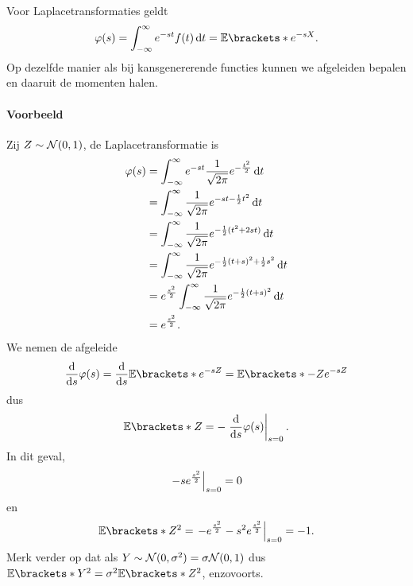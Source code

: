 Voor Laplacetransformaties geldt
\[
    \phi(s) = \int_{-\infty}^\infty e^{-st} f(t) \d t = \E{e^{-sX}}.
\]
Op dezelfde manier als bij kansgenererende functies kunnen we afgeleiden bepalen en daaruit de momenten halen.

\paragraph{Voorbeeld}

Zij $Z \sim \mathcal N(0,1)$, de Laplacetransformatie is
\begin{align*}
    \varphi(s) &= \int_{-\infty}^\infty e^{-st} \frac{1}{\sqrt{2\pi}} e^{-\frac{t^2}{2}} \mathop{}\!\mathrm{d} t \\
    &= \int_{-\infty}^\infty \frac{1}{\sqrt{2 \pi}} e^{-st-\frac 1 2 t^2} \mathop{}\!\mathrm{d} t \\
    &= \int_{-\infty}^\infty \frac{1}{\sqrt{2 \pi}} e^{-\frac 1 2 (t^2 + 2st)} \mathop{}\!\mathrm{d} t \\
    &= \int_{-\infty}^\infty \frac{1}{\sqrt{2 \pi}} e^{- \frac 1 2 (t+s)^2 + \frac 1 2 s^2} \mathop{}\!\mathrm{d} t \\
    &= e^{\frac{s^2}{2}} \int_{-\infty}^\infty \frac{1}{\sqrt{2 \pi}} e^{- \frac 1 2 (t+s)^2} \mathop{}\!\mathrm{d} t \\
    &= e^{\frac{s^2}{2}}.
\end{align*}
We nemen de afgeleide
\[
    \frac{\d}{\d s} \phi (s) = \frac{\d}{\d s} \E{e^{-sZ}} = \E{-Z e^{-sZ}}
\]
dus 
\[
    \E{Z} = - \eval{\frac{\d}{\d s} \phi(s)}_{s=0}.
\]
In dit geval,
\[
    \left.-s e^{\frac{s^2}{2}}\right\rvert_{s=0} = 0
\]
en 
\[
    \E{Z^2} = \eval{-e^{\frac{s^2}{2}} - s^2 e^{\frac{s^2}{2}}}_{s=0} = -1.
\]
Merk verder op dat als $Y \sim \mathcal N(0,\sigma^2) = \sigma \mathcal N(0,1)$ dus $\E{Y^2} = \sigma^2 \E{Z^2}$, enzovoorts.
